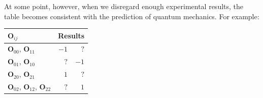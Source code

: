 \documentclass[english,reprint, aps, prl,superscriptaddress, showpacs,
showkeys, longbibliography, amsmath, amssymb, floatfix]{revtex4-1}
\theoremstyle{plain}
\theoremstyle{definition}
\newcommand{\missing}{?}
\begin{document}

\noindent At some point, however, when we disregard enough
experimental results, the table becomes consistent with the prediction
of quantum mechanics. For example:

\begin{center}
\begin{tabular}{l@{\qquad}r@{\qquad}r}
\toprule 
\addlinespace
$\mathbf{O}_{ij}$  & \multicolumn{2}{c}{Results} \\
\midrule
\midrule 
\addlinespace
$\mathbf{O}_{00}$, $\mathbf{O}_{11}$ & $-1$  & $?$  \\
\midrule 
\addlinespace
$\mathbf{O}_{01}$, $\mathbf{O}_{10}$ & $?$  & $-1$  \\
\midrule 
\addlinespace
$\mathbf{O}_{20}$, $\mathbf{O}_{21}$ & $1$  & $?$  \\
\midrule 
\addlinespace
$\mathbf{O}_{02}$, $\mathbf{O}_{12}$, $\mathbf{O}_{22}$ & $?$  & $1$  \\
\bottomrule
\end{tabular}
\par\end{center}
\end{document}
